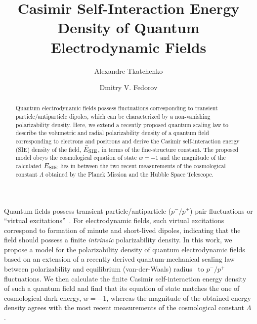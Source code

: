 \documentclass[aps,prl,twocolumn,showpacs,groupaddress]{revtex4-1}
\begin{document}
\title{Casimir Self-Interaction Energy Density of Quantum Electrodynamic Fields}
\author{Alexandre Tkatchenko}
\author{Dmitry V. Fedorov}
\begin{abstract}
Quantum electrodynamic fields possess fluctuations corresponding to transient particle/antiparticle dipoles, which can be characterized by a non-vanishing polarizability density. Here, we extend a recently proposed quantum scaling law to describe the volumetric and radial polarizability density of a quantum field corresponding to electrons and positrons and derive the Casimir self-interaction energy (SIE) density of the field, $\bar{E}_{\rm{SIE}}$, in terms of the fine-structure constant. The proposed model obeys the cosmological equation of state $w=-1$ and the magnitude of the calculated $\bar{E}_{\rm{SIE}}$ lies in between the two recent measurements of the cosmological constant $\Lambda$ obtained by the Planck Mission and the Hubble Space Telescope. 
\end{abstract}
%
\maketitle


Quantum fields possess transient particle/antiparticle ($p^-/p^+$) pair fluctuations or ``virtual excitations''~\cite{Milonni-book,Zee-book}. 
For electrodynamic fields, such virtual excitations correspond to formation of minute and short-lived dipoles, indicating that the field should possess a finite \emph{intrinsic} polarizability density. 
In this work, we propose a model for the polarizability density of quantum electrodynamic fields based on an extension of a recently derived quantum-mechanical scaling law between polarizability and equilibrium (van-der-Waals) radius~\cite{DimaPRL,alphaJPCL} to $p^-/p^+$ fluctuations. We then calculate the finite Casimir self-interaction energy density of such a quantum field and find that its equation of state 
matches the one of cosmological dark energy, $w=-1$, whereas the magnitude of the obtained
energy density agrees with the most recent measurements of the cosmological constant $\Lambda$.  
\end{document}
